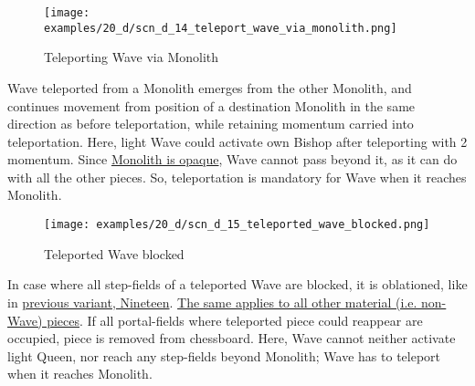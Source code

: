 \clearpage %

\vspace*{-2.3\baselineskip}
\noindent
\begin{figure}[!h]
\texttt{[image: examples/20\_d/scn\_d\_14\_teleport\_wave\_via\_monolith.png]}
\vspace*{-1.3\baselineskip}
\caption{Teleporting Wave via Monolith}
\label{fig:scn_d_14_teleport_wave_via_monolith}
\end{figure}

\vspace*{-0.4\baselineskip}
Wave teleported from a Monolith emerges from the other Monolith, and continues
movement from position of a destination Monolith in the same direction as before
teleportation, while retaining momentum carried into teleportation.
Here, light Wave could activate own Bishop after teleporting with 2 momentum. \newline
Since \hyperref[fig:scn_d_09_monolith_is_opaque]{Monolith is opaque}, Wave cannot
pass beyond it, as it can do with all the other pieces. So, teleportation is
mandatory for Wave when it reaches Monolith.

\clearpage %

\vspace*{-2.3\baselineskip}
\noindent
\begin{figure}[!h]
\texttt{[image: examples/20\_d/scn\_d\_15\_teleported\_wave\_blocked.png]}
\vspace*{-1.3\baselineskip}
\caption{Teleported Wave blocked}
\label{fig:scn_d_15_teleported_wave_blocked}
\end{figure}

\vspace*{-0.4\baselineskip}
In case where all step-fields of a teleported Wave are blocked, it is oblationed, like in
\hyperref[fig:scn_n_06_teleport_wave_blocked]{previous variant, Nineteen}. \newline
\hyperref[fig:scn_n_03_teleport_move_2]{The same applies to all other material (i.e. non-Wave) pieces}.
If all portal-fields where teleported piece could reappear are occupied, piece is removed
from chessboard. \newline
Here, Wave cannot neither activate light Queen, nor reach any step-fields beyond Monolith;
Wave has to teleport when it reaches Monolith.

